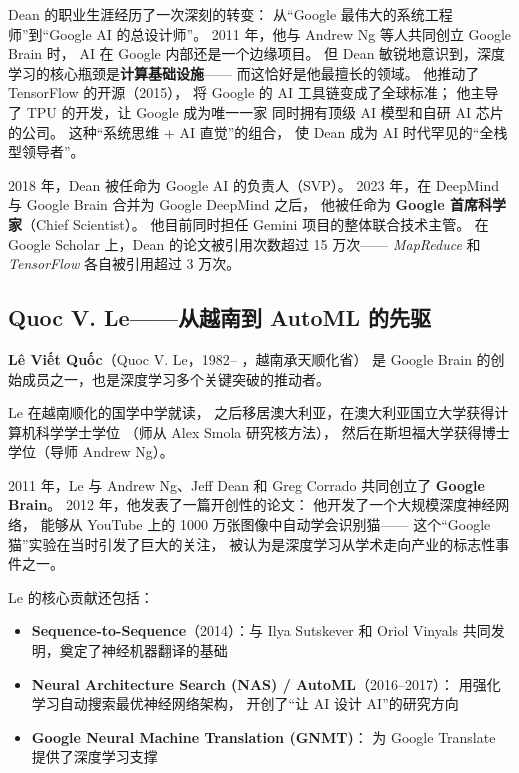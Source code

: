 \begin{whybox}
Dean 的职业生涯经历了一次深刻的转变：
从``Google 最伟大的系统工程师''到``Google AI 的总设计师''。
2011 年，他与 Andrew Ng 等人共同创立 Google Brain 时，
AI 在 Google 内部还是一个边缘项目。
但 Dean 敏锐地意识到，深度学习的核心瓶颈是\textbf{计算基础设施}——
而这恰好是他最擅长的领域。
他推动了 TensorFlow 的开源（2015），
将 Google 的 AI 工具链变成了全球标准；
他主导了 TPU 的开发，让 Google 成为唯一一家
同时拥有顶级 AI 模型和自研 AI 芯片的公司。
这种``系统思维 + AI 直觉''的组合，
使 Dean 成为 AI 时代罕见的``全栈型领导者''。
\end{whybox}

2018 年，Dean 被任命为 Google AI 的负责人（SVP）。
2023 年，在 DeepMind 与 Google Brain 合并为 Google DeepMind 之后，
他被任命为 \textbf{Google 首席科学家}（Chief Scientist）。
他目前同时担任 Gemini 项目的整体联合技术主管。
在 Google Scholar 上，Dean 的论文被引用次数超过 15 万次——
\textit{MapReduce} 和 \textit{TensorFlow} 各自被引用超过 3 万次。


\subsection{Quoc V. Le——从越南到 AutoML 的先驱}
\label{subsec:quoc-le}

\noindent\textbf{Lê Viết Quốc}（Quoc V. Le，1982-- ，越南承天顺化省）
是 Google Brain 的创始成员之一，也是深度学习多个关键突破的推动者。

Le 在越南顺化的国学中学就读，
之后移居澳大利亚，在澳大利亚国立大学获得计算机科学学士学位
（师从 Alex Smola 研究核方法），
然后在斯坦福大学获得博士学位（导师 Andrew Ng）。

2011 年，Le 与 Andrew Ng、Jeff Dean 和 Greg Corrado
共同创立了 \textbf{Google Brain}。
2012 年，他发表了一篇开创性的论文：
他开发了一个大规模深度神经网络，
能够从 YouTube 上的 1000 万张图像中自动学会识别猫——
这个``Google 猫''实验在当时引发了巨大的关注，
被认为是深度学习从学术走向产业的标志性事件之一。

Le 的核心贡献还包括：

\begin{itemize}[noitemsep]
  \item \textbf{Sequence-to-Sequence}（2014）：与 Ilya Sutskever 和 Oriol Vinyals
        共同发明，奠定了神经机器翻译的基础
  \item \textbf{Neural Architecture Search (NAS) / AutoML}（2016--2017）：
        用强化学习自动搜索最优神经网络架构，
        开创了``让 AI 设计 AI''的研究方向
  \item \textbf{Google Neural Machine Translation (GNMT)}：
        为 Google Translate 提供了深度学习支撑
\end{itemize}

